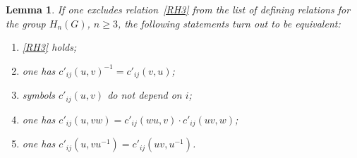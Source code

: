 \documentclass[oneside, 12pt]{amsart}
\theoremstyle{plain}
\numberwithin{equation}{section}
\newtheorem{lemma}{Lemma}
\numberwithin{lemma}{section}
\theoremstyle{remark}
\theoremstyle{definition}
\begin{document}
\begin{lemma}
If one excludes relation~\eqref{RH3} from the list of defining relations for the group $H_n(G)$, $n\geq 3$, the following statements turn out to be equivalent:
\begin{enumerate}
\item \label{item1} \eqref{RH3} holds;
\item \label{item4} one has $c'_{ij}(u, v)^{-1} = c'_{ij}(v, u)$;
\item \label{item5} symbols $c'_{ij}(u, v)$ do not depend on $i$;
\item \label{item5} one has $c'_{ij}(u, vw) = c'_{ij}(wu, v) \cdot c'_{ij}(uv, w)$;
\item \label{item6} one has $c'_{ij}(u, vu^{-1}) = c'_{ij}(uv, u^{-1})$.
\end{enumerate}
\end{lemma}
\end{document}

